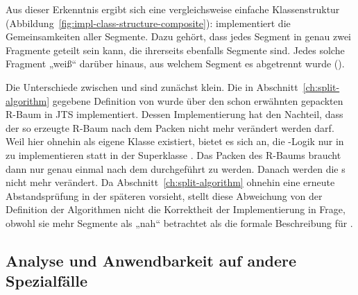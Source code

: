 \documentclass[../main/thesis.tex]{subfiles}
\begin{document}
Aus dieser Erkenntnis ergibt sich eine vergleichsweise einfache Klassenstruktur (Abbildung~\ref{fig:impl-class-structure-composite}):
 implementiert die Gemeinsamkeiten aller Segmente.
Dazu gehört, dass jedes Segment in genau zwei Fragmente geteilt sein kann, die ihrerseits ebenfalls Segmente sind.
Jedes solche Fragment „weiß“ darüber hinaus, aus welchem Segment es abgetrennt wurde ().


Die Unterschiede zwischen  und  sind zunächst klein.
Die in Abschnitt~\ref{ch:split-algorithm} gegebene Definition von  wurde über den schon erwähnten gepackten R-Baum in JTS implementiert.
Dessen Implementierung hat den Nachteil, dass der so erzeugte R-Baum nach dem Packen nicht mehr verändert werden darf.
Weil hier ohnehin  als eigene Klasse existiert, bietet es sich an, die -Logik nur in  zu implementieren statt in der Superklasse .
Das Packen des R-Baums braucht dann nur genau einmal nach dem  durchgeführt zu werden.
Danach werden die s nicht mehr verändert.
Da Abschnitt~\ref{ch:split-algorithm} ohnehin eine erneute Abstandsprüfung in der späteren  vorsieht, stellt diese Abweichung von der Definition der Algorithmen nicht die Korrektheit der Implementierung in Frage, obwohl sie mehr Segmente als „nah“ betrachtet als die formale Beschreibung für .





\subsection{Analyse und Anwendbarkeit auf andere Spezialfälle}
\label{ch:impl-analyser}
\end{document}
